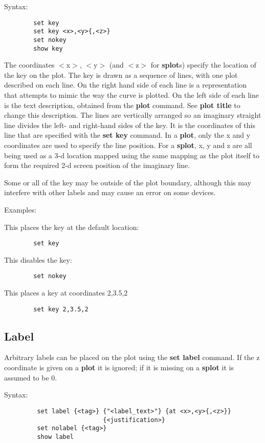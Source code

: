 Syntax:
\begin{verbatim}
        set key
        set key <x>,<y>{,<z>}
        set nokey
        show key
\end{verbatim}

The coordinates $<$x$>$, $<$y$>$ (and $<$z$>$ for {\bf splot}s) specify the location
of the key on the plot. The key is drawn as a sequence of lines, with
one plot described on each line. On the right hand side of each line
is a representation that attempts to mimic the way the curve is
plotted.  On the left side of each line is the text description,
obtained from the {\bf plot} command. See {\bf plot title} to change this
description. The lines are vertically arranged so an imaginary
straight line divides the left- and right-hand sides of the key. It is
the coordinates of this line that are specified with the {\bf set key}
command. In a {\bf plot}, only the x and y coordinates are used to specify
the line position.  For a {\bf splot}, x, y and z are all being used as a
3-d location mapped using the same mapping as the plot itself to form
the required 2-d screen position of the imaginary line.

Some or all of the key may be outside of the plot boundary, although
this may interfere with other labels and may cause an error on some
devices.

Examples:

This places the key at the default location:
\begin{verbatim}
        set key
\end{verbatim}
This disables the key:
\begin{verbatim}
        set nokey
\end{verbatim}
This places a key at coordinates 2,3.5,2
\begin{verbatim}
        set key 2,3.5,2
\end{verbatim}
\subsection{Label}
Arbitrary labels can be placed on the plot using the {\bf set label}
command.  If the z coordinate is given on a {\bf plot} it is ignored; if
it is missing on a {\bf splot} it is assumed to be 0.

Syntax:

\begin{verbatim}
         set label {<tag>} {"<label_text>"} {at <x>,<y>{,<z>}}
                           {<justification>}
         set nolabel {<tag>}
         show label
\end{verbatim}


